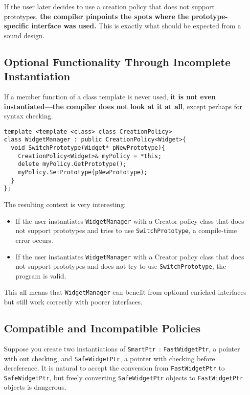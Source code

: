 If the user later decides to use a creation policy that does not
support prototypes, \textbf{the compiler pinpoints the spots where the
prototype-specific interface was used.} This is exactly what should be
expected from a sound design.

\subsection{Optional Functionality Through Incomplete Instantiation}

If a member function of a class template is never used, \textbf{it is not even
instantiated—the compiler does not look at it at all}, except perhaps
for syntax checking.

\begin{verbatim}
template <template <class> class CreationPolicy>
class WidgetManager : public CreationPolicy<Widget>{
  void SwitchPrototype(Widget* pNewPrototype){
    CreationPolicy<Widget>& myPolicy = *this;
    delete myPolicy.GetPrototype();
    myPolicy.SetPrototype(pNewPrototype);
  }
};
\end{verbatim}
The resulting context is very interesting:
\begin{itemize}
\item If the user instantiates \texttt{WidgetManager} with a Creator
  policy class that does not support prototypes and tries to use
  \texttt{SwitchPrototype}, a compile-time error occurs.
\item  If the user instantiates \texttt{WidgetManager} with a Creator
  policy class that does not support prototypes and does not try to
  use \texttt{SwitchPrototype}, the program is valid.
\end{itemize}
This all means that \texttt{WidgetManager} can benefit from optional
enriched interfaces but still work correctly with poorer interfaces.

\subsection{Compatible and Incompatible Policies}

Suppose you create two instantiations of \texttt{SmartPtr }:
\texttt{FastWidgetPtr}, a pointer with out checking, and 
\texttt{SafeWidgetPtr}, a pointer with checking before dereference.
It is natural to accept the conversion from \texttt{FastWidgetPtr} to
\texttt{SafeWidgetPtr}, but freely converting \texttt{SafeWidgetPtr}
objects to \texttt{FastWidgetPtr} objects is dangerous. 

